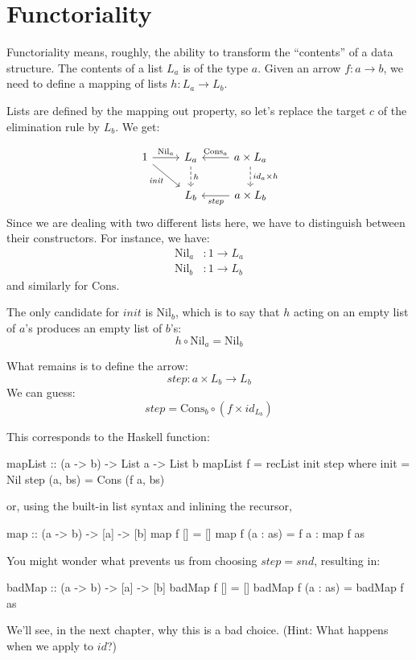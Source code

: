 \documentclass[DaoFP]{subfiles}
\begin{document}
\section{Functoriality}

Functoriality means, roughly, the ability to transform the ``contents'' of a data structure. The contents of a list $L_a$ is of the type $a$. Given an arrow $f \colon a \to b$, we need to define a mapping of lists $h \colon L_a \to L_b$.

Lists are defined by the mapping out property, so let's replace the target $c$ of the elimination rule by $L_b$. We get:

\[
 \begin{tikzcd}
 1
 \arrow[r, "\text{Nil}_a"]
 \arrow[rd, "\mathit{init}"']
 &L_a
\arrow[d, dashed, "h"]
&a \times L_a
  \arrow[l, "\text{Cons}_a"']
\arrow[d, dashed, "id_a \times h"]
\\
& L_b
& a \times L_b
\arrow[l, "\mathit{step}"]
  \end{tikzcd}
\]
Since we are dealing with two different lists here, we have to distinguish between their constructors. For instance, we have: 
\begin{align*}
\text{Nil}_a &\colon 1 \to L_a \\
\text{Nil}_b &\colon 1 \to L_b 
\end{align*}
and similarly for $\text{Cons}$.

The only candidate for $\mathit{init}$ is $\text{Nil}_b$, which is to say that $h$ acting on an empty list of $a$'s produces an empty list of $b$'s:
\[ h \circ \text{Nil}_a = \text{Nil}_b \]

What remains is to define the arrow:
\[\mathit{step} \colon a \times L_b \to L_b\]
We can guess:
\[ \mathit{step} = \text{Cons}_b \circ (f \times id_{L_b}) \]

This corresponds to the Haskell function:

\begin{haskell}
mapList :: (a -> b) -> List a -> List b
mapList f = recList init step
  where
    init = Nil
    step (a, bs) = Cons (f a, bs)
\end{haskell}
or, using the built-in list syntax and inlining the recursor,
\begin{haskell}
map :: (a -> b) -> [a] -> [b]
map f [] = []
map f (a : as) = f a : map f as
\end{haskell}

You might wonder what prevents us from choosing $\mathit{step} = \mathit{snd}$, resulting in:
\begin{haskell}
badMap :: (a -> b) -> [a] -> [b]
badMap f [] = []
badMap f (a : as) = badMap f as
\end{haskell}
We'll see, in the next chapter, why this is a bad choice. (Hint: What happens when we apply  to $id$?)
\end{document}
